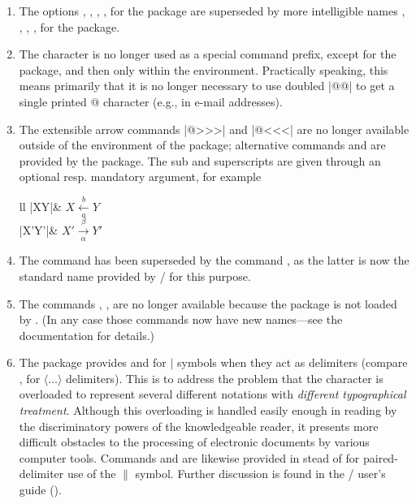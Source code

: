 \documentclass{amsdtx}
\begin{document}
\begin{enumerate}

\item The options , , ,
,  for the  package are
superseded by more intelligible names ,
, , ,  for
the  package.

\item The \qc{\@} character is no longer used as a special command
prefix, except for the  package, and then only within the
 environment. Practically speaking, this means primarily that it
is no longer necessary to use doubled |@@| to get a single printed @
character (e.g., in e-mail addresses).

\item The extensible arrow commands |@>>>| and |@<<<| are no longer
available outside of the  environment of the 
package; alternative commands  and  are
provided by the  package. The sub and superscripts are
given through an optional resp. mandatory argument, for example
\begin{ctab}{ll}
|XY|& $X\xleftarrow[a]{b}Y$\\
|X'\xrightarrow[\alpha]{\beta}Y'|& $X'\xrightarrow[\alpha]{\beta}Y'$
\end{ctab}

\item The command  has been superseded by the command
, as the latter is now the standard name provided by \latex/
for this purpose.

\item The commands , ,  are no longer
available because the  package is not loaded by
. (In any case those commands now have new names---see the
 documentation for details.)

\item The  package provides  and  for
$\vert$ symbols when they act as delimiters (compare ,
 for $\langle\ldots\rangle$ delimiters). This is to address
the problem that the \qc{\|} character is overloaded to represent
several different notations with \emph{different typographical
treatment}. Although this overloading is handled easily enough in
reading by the discriminatory powers of the knowledgeable reader, it
presents more difficult obstacles to the processing of electronic
documents by various computer tools. Commands  and 
are likewise provided in stead of \cn{\|} for paired-delimiter use of
the $\|$ symbol. Further discussion is found in the \amslatex/ user's
guide ().


\end{enumerate}
\end{document}
